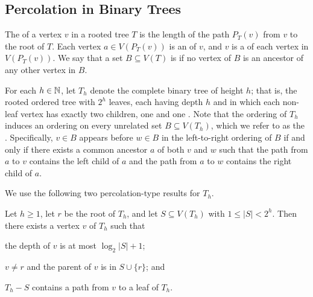 \documentclass{patmorin}
\renewcommand{\le}{\leqslant}
\renewcommand{\ge}{\geqslant}
\begin{document}
\subsection{Percolation in Binary Trees}


The  of a vertex $v$ in a rooted tree $T$ is the length of the path $P_T(v)$ from $v$ to the root of $T$.  Each vertex $a\in V(P_T(v))$ is an  of $v$, and $v$ is a  of each vertex in $V(P_T(v))$.  We say that a set $B\subseteq V(T)$ is  if no vertex of $B$ is an ancestor of any other vertex in $B$.

For each $h\in\mathbb{N}$, let $T_h$ denote the complete binary tree of height $h$; that is, the rooted ordered tree with $2^h$ leaves, each having depth $h$ and in which each non-leaf vertex has exactly two children, one  and one .  Note that the ordering of $T_h$ induces an ordering on every unrelated set $B\subseteq V(T_h)$, which we refer to as the .  Specifically, $v\in B$ appears before $w\in B$ in the left-to-right ordering of $B$ if and only if there exists a common ancestor $a$ of both $v$ and $w$ such that the path from $a$ to $v$ contains the left child of $a$ and the path from $a$ to $w$ contains the right child of $a$.

We use the following two percolation-type results for $T_h$.

\begin{lem}\label{one_path}
  Let $h\ge 1$, let $r$ be the root of $T_h$, and
  let $S\subseteq V(T_h)$ with $1\le |S|< 2^h$. Then there exists a vertex $v$ of $T_h$ such that
  \begin{compactenum}[(i)]
    \item the depth of $v$ is at most $\log_2|S|+1$;
    \item $v\neq r$ and the parent of $v$ is in $S\cup\{r\}$; and
    \item $T_h-S$ contains a path from $v$ to a leaf of $T_h$.
  \end{compactenum}
\end{lem}
\end{document}
